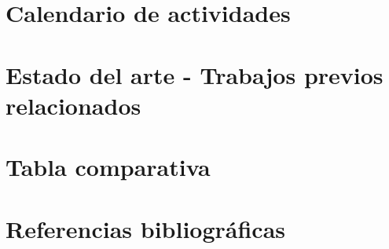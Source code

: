 \documentclass[12pt,letterpaper,final]{article}
\begin{document}
    \section*{Calendario de actividades}
    
    \clearpage

    \section*{Estado del arte - Trabajos previos relacionados}
    

    \section*{Tabla comparativa}
    
    \clearpage

    \section*{Referencias bibliográficas}
    
    
\end{document}
